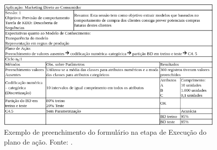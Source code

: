 \documentclass[diss-proposta,nocipinfo]{texufpel}
\begin{document}
\begin{figure}[htbp]
  \centering \includegraphics[scale=.4]{imagens/formulario-etapa-execucao-dos-planos-de-acao.png}
  \caption{Exemplo de preenchimento do formulário na etapa de Execução do plano de ação. Fonte: \cite{goldschmidt2015data}.}
  \label{fig:formulario-etapa-execucao-dos-planos-de-acao}
\end{figure}




\end{document}

